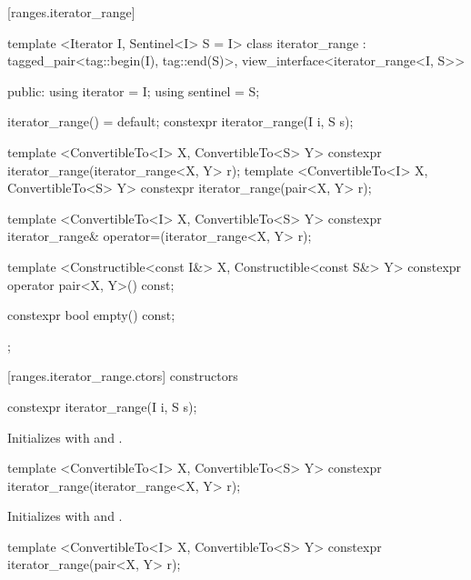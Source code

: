[ranges.iterator_range]{}

%
\begin{codeblock}
template <Iterator I, Sentinel<I> S = I>
class iterator_range
  : tagged_pair<tag::begin(I), tag::end(S)>,
    view_interface<iterator_range<I, S>> {
public:
  using iterator = I;
  using sentinel = S;

  iterator_range() = default;
  constexpr iterator_range(I i, S s);

  template <ConvertibleTo<I> X, ConvertibleTo<S> Y>
    constexpr iterator_range(iterator_range<X, Y> r);
  template <ConvertibleTo<I> X, ConvertibleTo<S> Y>
    constexpr iterator_range(pair<X, Y> r);

  template <ConvertibleTo<I> X, ConvertibleTo<S> Y>
    constexpr iterator_range& operator=(iterator_range<X, Y> r);

  template <Constructible<const I&> X, Constructible<const S&> Y>
    constexpr operator pair<X, Y>() const;

  constexpr bool empty() const;
};
\end{codeblock}

[ranges.iterator_range.ctors]{ constructors}

%
\begin{itemdecl}
constexpr iterator_range(I i, S s);
\end{itemdecl}

\begin{itemdescr}
\pnum
\effects Initializes  with
 and .
\end{itemdescr}

%
\begin{itemdecl}
template <ConvertibleTo<I> X, ConvertibleTo<S> Y>
  constexpr iterator_range(iterator_range<X, Y> r);
\end{itemdecl}

\begin{itemdescr}
\pnum
\effects Initializes  with
 and .
\end{itemdescr}

%
\begin{itemdecl}
template <ConvertibleTo<I> X, ConvertibleTo<S> Y>
  constexpr iterator_range(pair<X, Y> r);
\end{itemdecl}

